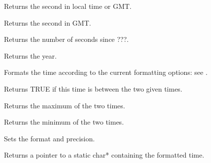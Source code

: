 
Returns the second in local time or GMT.

\label{wxtimegetsecondgmt}


Returns the second in GMT.

\label{wxtimegetseconds}


Returns the number of seconds since ???.

\label{wxtimegetyear}


Returns the year.

\label{wxtimeformattime}


Formats the time according to the current formatting options: see .

\label{wxtimeisbetween}


Returns TRUE if this time is between the two given times.

\label{wxtimemax}


Returns the maximum of the two times.

\label{wxtimemin}


Returns the minimum of the two times.

\label{wxtimesetformat}


Sets the format and precision.

\label{wxtimestring}


Returns a pointer to a static char* containing the formatted time.

